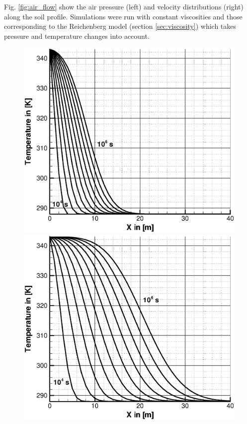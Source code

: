 Fig. \ref{fig:air_flow} show the air pressure (left) and velocity
distributions (right) along the soil profile. Simulations were run with
constant viscosities and those corresponding to the Reichenberg
model (section \ref{sec:viscosity}) which takes pressure and
temperature changes into account.

\begin{figure}[htb!]
\includegraphics[scale=0.4]{H_GAS/figures/t_1.eps}\\
\includegraphics[scale=0.4]{H_GAS/figures/t_10.eps}\\

\end{figure}
